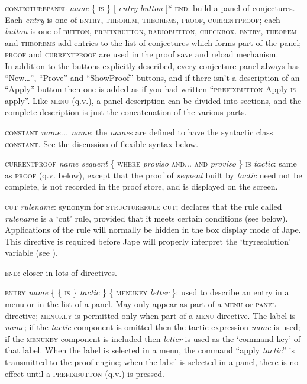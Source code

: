 \textsc{conjecturepanel} \textit{name} \{ \textsc{is} \} [ \textit{entry} {\textbar} \textit{button} ]* \textsc{end}: build a panel of conjectures. Each \textit{entry} is one of \textsc{entry}, \textsc{theorem, theorems, proof, currentproof}; each \textit{button} is one of \textsc{button, prefixbutton, radiobutton, checkbox}. \textsc{entry}, \textsc{theorem} and \textsc{theorems} add entries to the list of conjectures which forms part of the panel; \textsc{proof} and \textsc{currentproof} are used in the proof save and reload mechanism. \\
\tab In addition to the buttons explicitly described, every conjecture panel always has ``New\dots '', ``Prove'' and ``Show{\nobreakspace}Proof'' buttons, and if there isn't a description of an ``Apply'' button then one is added as if you had written ``\textsc{prefixbutton} Apply \textsc{is} apply''. Like \textsc{menu} (q.v.), a panel description can be divided into sections, and the complete description is just the concatenation of the various parts.


\textsc{constant} \textit{name... name}: the \textit{name}s are defined to have the syntactic class \textsc{constant}. See the discussion of flexible syntax below.


\textsc{currentproof} \textit{name sequent} \{ \textsc{where} \textit{proviso} \textsc{and... and} \textit{proviso} \textsc{\} is} \textit{tactic}: same as \textsc{proof} (q.v. below), except that the proof of \textit{sequent} built by \textit{tactic} need not be complete, is not recorded in the proof store, and is displayed on the screen.


\textsc{cut} \textit{rulename}: synonym for \textsc{structurerule} \textsc{cut}; declares that the rule called \textit{rulename} is a `cut' rule, provided that it meets certain conditions (see below). Applications of the rule will normally be hidden in the box display mode of Jape. This directive is required before Jape will properly interpret the `tryresolution' variable (see ).


\textsc{end:} closer in lots of directives.


\textsc{entry} \textit{name} \{ \{ \textsc{is} \} \textit{tactic} \} \{ \textsc{menukey} \textit{letter} \}: used to describe an entry in a menu or in the list of a panel. May only appear as part of a \textsc{menu} or \textsc{panel} directive; \textsc{menukey} is permitted only when part of a \textsc{menu} directive. The label is \textit{name}; if the \textit{tactic} component is omitted then the tactic expression \textit{name} is used; if the \textsc{menukey} component is included then \textit{letter} is used as the `command key' of that label. When the label is selected in a menu, the command ``apply \textit{tactic}'' is transmitted to the proof engine; when the label is selected in a panel, there is no effect until a \textsc{prefixbutton} (q.v.) is pressed.



